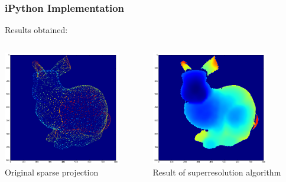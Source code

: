 \documentclass{beamer}
\begin{document}
\begin{frame}
\frametitle{iPython Implementation}
	Results obtained:
	\begin{columns}
	\begin{column}[T]{.5\textwidth}
		\includegraphics[height=5cm]{res1.png}
		\\ Original sparse projection
	\end{column}
	\begin{column}[T]{.5\textwidth}
		\includegraphics[height=5cm]{res1d.png}
		\\ Result of superresolution algorithm
	\end{column}
	\end{columns}
\end{frame}
\end{document}
